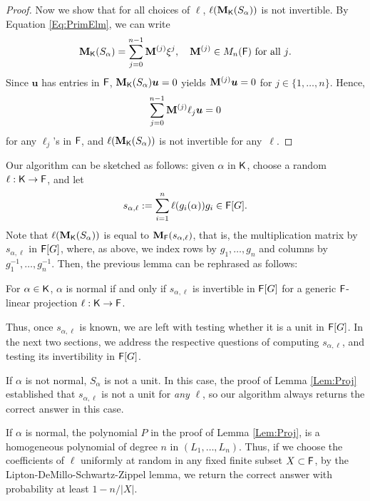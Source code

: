 \begin{proof}
  Now we show that for all choices of $\ell$, $\ell(\mat M_\K(S_\alpha))$ is not invertible. By Equation \eqref{Eq:PrimElm}, we can write
  $$\mat M_\K(S_\alpha) = \sum_{j = 0}^{n-1} \mat M^{(j)} \xbar^j, \quad 
  \mat M^{(j)} \in M_{n}(\F) \text{~for all $j$}.$$ 
  Since $\boldsymbol{u}$ has entries in ${\mathsf{F}}$,
  $\mat M_\K(S_\alpha) \boldsymbol{u} =0$ yields
  $\mat M^{(j)}\boldsymbol{u} = 0$ for
  $j \in \lbrace 1, \ldots , n \rbrace$. Hence,
$$\sum_{j = 0}^{n-1} \mat M^{(j)} \ell_j \boldsymbol{u} = 0$$ for any 
$\ell_j$'s in ${\mathsf{F}}$, and $\ell(\mat M_\K(S_\alpha))$ is not invertible for any~$\ell$.
\end{proof} 
Our algorithm can be sketched as follows: given $\alpha$ in ${\mathsf{K}}$,
choose a random $\ell: {\mathsf{K}}\to{\mathsf{F}}$, and let
\begin{equation}\label{def:s_alpha_ell}
s_{\alpha,\ell}:=\sum_{i=1}^n \ell(g_i(\alpha))g_i \in {\mathsf{F}}[G].
\end{equation}
Note that $\ell(\mat M_\K(S_\alpha))$ is equal to $\mat
M_\F(s_{\alpha,\ell})$, that is, the multiplication matrix by
$s_{\alpha,\ell}$ in ${\mathsf{F}}[G]$, where, as above, we index rows by
$g_1,\dots,g_n$ and columns by $g_1^{-1},\dots,g_n^{-1}$.  Then,
the previous lemma can be rephrased as follows:
\begin{lemma}
  \label{Lem:Proj-bis}
  For $\alpha \in {\mathsf{K}}$, $\alpha$ is normal if and only if
  $s_{\alpha,\ell}$ is invertible in ${\mathsf{F}}[G]$ for a generic
  ${\mathsf{F}}$-linear projection $\ell: {\mathsf{K}} \to {\mathsf{F}}$.
\end{lemma}
Thus, once $s_{\alpha,\ell}$ is known, we are left with testing
whether it is a unit in ${\mathsf{F}}[G]$. In the next two sections, we address
the respective questions of computing $s_{\alpha,\ell}$, and testing
its invertibility in ${\mathsf{F}}[G]$.
\begin{remark}\label{rmk:mc-epsilon}
If $\alpha$ is not normal, $S_\alpha$ is not a unit. In this case, the
proof of Lemma \ref{Lem:Proj} established that $s_{\alpha,\ell}$ is
not a unit for {\em any} $\ell$, so our algorithm always returns the
correct answer in this case.

If $\alpha$ is normal, the polynomial $P$ in the proof of Lemma
\ref{Lem:Proj}, is a homogeneous polynomial of degree $n$ in $(L_1,
\ldots , L_n)$. Thus, if we choose the coefficients of $\ell$ uniformly at
random in any fixed finite subset $X \subset {\mathsf{F}}$, by the
Lipton-DeMillo-Schwartz-Zippel lemma, we return the correct 
answer with probability at least $1-n/|X|$. 
\end{remark}





